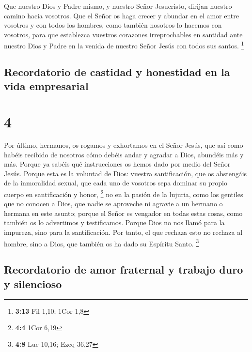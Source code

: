  Que nuestro Dios y Padre mismo, y nuestro Señor
Jesucristo, dirijan nuestro camino hacia vosotros.  Que
el Señor os haga crecer y abundar en el amor entre vosotros y con todos
los hombres, como también nosotros lo hacemos con vosotros,
 para que establezca vuestros corazones irreprochables en
santidad ante nuestro Dios y Padre en la venida de nuestro Señor Jesús
con todos sus santos. \footnote{\textbf{3:13} Fil 1,10; 1Cor 1,8}

\hypertarget{recordatorio-de-castidad-y-honestidad-en-la-vida-empresarial}{%
\subsection{Recordatorio de castidad y honestidad en la vida
empresarial}\label{recordatorio-de-castidad-y-honestidad-en-la-vida-empresarial}}

\hypertarget{section-3}{%
\section{4}\label{section-3}}

 Por último, hermanos, os rogamos y exhortamos en el Señor
Jesús, que así como habéis recibido de nosotros cómo debéis andar y
agradar a Dios, abundéis más y más.  Porque ya sabéis qué
instrucciones os hemos dado por medio del Señor Jesús. 
Porque esta es la voluntad de Dios: vuestra santificación, que os
abstengáis de la inmoralidad sexual,  que cada uno de
vosotros sepa dominar su propio cuerpo en santificación y honor,
\footnote{\textbf{4:4} 1Cor 6,19}  no en la pasión de la
lujuria, como los gentiles que no conocen a Dios,  que
nadie se aproveche ni agravie a un hermano o hermana en este asunto;
porque el Señor es vengador en todas estas cosas, como también os lo
advertimos y testificamos.  Porque Dios no nos llamó para
la impureza, sino para la santificación.  Por tanto, el
que rechaza esto no rechaza al hombre, sino a Dios, que también os ha
dado su Espíritu Santo. \footnote{\textbf{4:8} Luc 10,16; Ezeq 36,27}

\hypertarget{recordatorio-de-amor-fraternal-y-trabajo-duro-y-silencioso}{%
\subsection{Recordatorio de amor fraternal y trabajo duro y
silencioso}\label{recordatorio-de-amor-fraternal-y-trabajo-duro-y-silencioso}}


